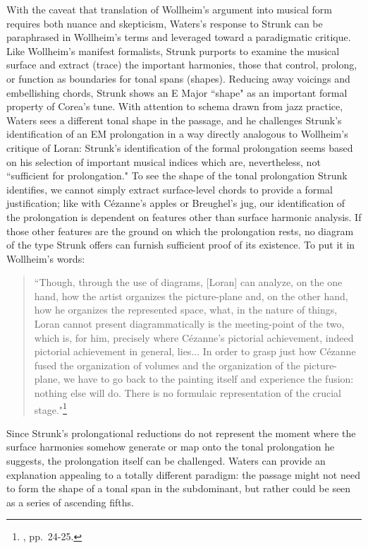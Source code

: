 
With the caveat that translation of Wollheim's argument into musical form requires both nuance and skepticism, Waters's response to Strunk can be paraphrased in Wollheim's terms and leveraged toward a paradigmatic critique.  Like Wollheim's manifest formalists, Strunk purports to examine the musical surface and extract (trace) the important harmonies, those that control, prolong, or function as boundaries for tonal spans (shapes).  Reducing away voicings and embellishing chords, Strunk shows an E Major ``shape" as an important formal property of Corea's tune.  With attention to schema drawn from jazz practice, Waters sees a different tonal shape in the passage, and he challenges Strunk's identification of an EM prolongation in a way directly analogous to Wollheim's critique of Loran: Strunk's identification of the formal prolongation seems based on his selection of important musical indices which are, nevertheless, not ``sufficient for prolongation."  To see the shape of the tonal prolongation Strunk identifies, we cannot simply extract surface-level chords to provide a formal justification; like with C\'{e}zanne's apples or Breughel's jug, our identification of the prolongation is dependent on features other than surface harmonic analysis.  If those other features are the ground on which the prolongation rests, no diagram of the type Strunk offers can furnish sufficient proof of its existence.  To put it in Wollheim's words:
\begin{quote}
``Though, through the use of diagrams, [Loran] can analyze, on the one hand, how the artist organizes the picture-plane and, on the other hand, how he organizes the represented space, what, in the nature of things, Loran cannot present diagrammatically is the meeting-point of the two, which is, for him, precisely where C\'{e}zanne's pictorial achievement, indeed pictorial achievement in general, lies... In order to grasp just how C\'{e}zanne fused the organization of volumes and the organization of the picture-plane, we have to go back to the painting itself and experience the fusion: nothing else will do.  There is no formulaic representation of the crucial stage."\footnote{\cite{wollheim1995}, pp.\ 24-25.}
\end{quote}
Since Strunk's prolongational reductions do not represent the moment where the surface harmonies somehow generate or map onto the tonal prolongation he suggests, the prolongation itself can be challenged.  Waters can provide an explanation appealing to a totally different paradigm: the passage might not need to form the shape of a tonal span in the subdominant, but rather could be seen as a series of ascending fifths.

